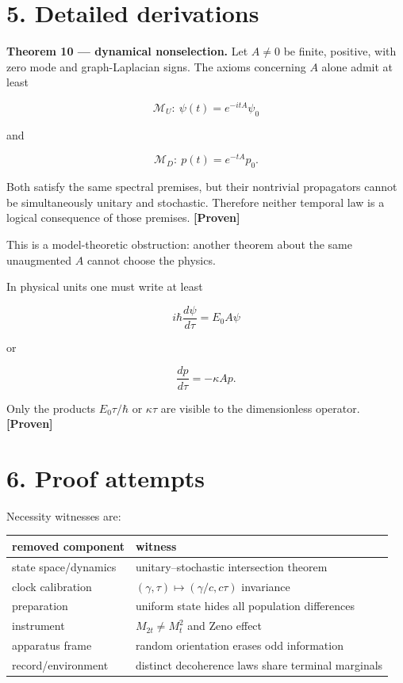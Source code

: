 \documentclass[11pt,a4paper,openany]{report}
\newcommand{\statusProven}{\textcolor{fingreen}{[Proven]}}
\begin{document}
\section{5. Detailed derivations}

\textbf{Theorem 10 — dynamical nonselection.} Let \(A\ne0\) be finite, positive, with zero mode and graph-Laplacian signs. The axioms concerning \(A\) alone admit at least

\[
\mathcal M_U:\ \psi(t)=e^{-itA}\psi_0
\]

and

\[
\mathcal M_D:\ p(t)=e^{-tA}p_0.
\]

Both satisfy the same spectral premises, but their nontrivial propagators cannot be simultaneously unitary and stochastic. Therefore neither temporal law is a logical consequence of those premises. \textbf{\statusProven{}}

This is a model-theoretic obstruction: another theorem about the same unaugmented \(A\) cannot choose the physics.

In physical units one must write at least

\[
i\hbar\frac{d\psi}{d\tau}=E_0A\psi
\]

or

\[
\frac{dp}{d\tau}=-\kappa Ap.
\]

Only the products \(E_0\tau/\hbar\) or \(\kappa\tau\) are visible to the dimensionless operator. \textbf{\statusProven{}}

\section{6. Proof attempts}

Necessity witnesses are:

\begin{center}
\begingroup\small
\setlength{\tabcolsep}{3.5pt}
\renewcommand{\arraystretch}{1.16}
\begin{longtable}{@{}p{}p{}@{}}
\toprule
\textbf{removed component} & \textbf{witness} \\
\midrule
\endhead
state space/\allowbreak{}dynamics & unitary–stochastic intersection theorem \\
clock calibration & \((\gamma,\tau)\mapsto(\gamma/c,c\tau)\) invariance \\
preparation & uniform state hides all population differences \\
instrument & \(M_{2t}\ne M_t^2\) and Zeno effect \\
apparatus frame & random orientation erases odd information \\
record/\allowbreak{}environment & distinct decoherence laws share terminal marginals \\
\bottomrule
\end{longtable}
\endgroup
\end{center}
\end{document}
